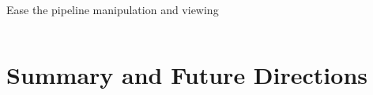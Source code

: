 \documentclass{beamer}
\begin{document}
\begin{frame}{Ease the pipeline manipulation and viewing}
\begin{columns}
\begin{column}{0.5\textwidth}

        \end{column}

    \end{columns}
\end{frame}

\section{Summary and Future Directions}
\end{document}
